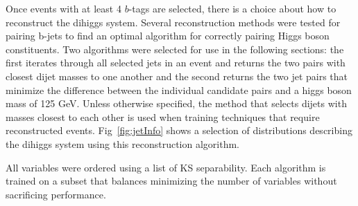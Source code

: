 Once events with at least 4 $b$-tags are selected, there is a choice about how to reconstruct the dihiggs system. Several reconstruction methods were tested for pairing b-jets to find an optimal algorithm for correctly pairing Higgs boson constituents. Two algorithms were selected for use in the following sections: the first iterates through all selected jets in an event and returns the two pairs with closest dijet masses to one another and the second returns the two jet pairs that minimize the difference between the individual candidate pairs and a higgs boson mass of 125 GeV. Unless otherwise specified, the method that selects dijets with masses closest to each other is used when training techniques that require reconstructed events. Fig~\ref{fig:jetInfo} shows a selection of distributions describing the dihiggs system using this reconstruction algorithm.%


All variables were ordered using a list of KS separability. Each algorithm is trained on a subset that balances minimizing the number of variables without sacrificing performance. 
